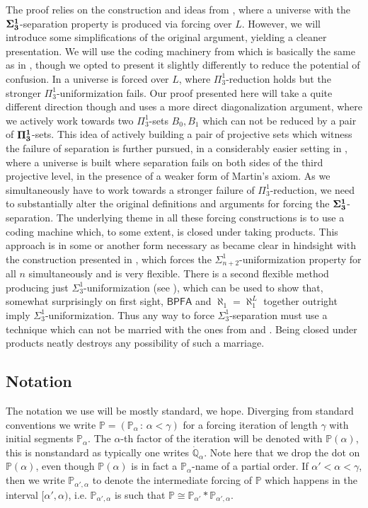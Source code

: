\documentclass[a4paper,11pt]{article}
\newcommand{\forceP}{\mathbb{P}}
\newcommand{\forceQ}{\mathbb{Q}}
\begin{document}
The proof relies on the construction and ideas from \cite{Ho1}, where a universe with the $\bf{\Sigma}^1_3$-separation property is produced via forcing over $L$. However, we will introduce some simplifications of the original argument, yielding a cleaner presentation. We will use the coding machinery from \cite{Ho3} which is basically the same as in \cite{Ho2}, though we opted to present it slightly differently to reduce the potential of confusion. In \cite{Ho3} a universe is forced over $L$, where $\Pi^1_3$-reduction holds but the stronger $\Pi^1_3$-uniformization fails. Our proof presented here will take a quite different direction though and uses a more direct diagonalization argument, where we actively work towards two $\Pi^1_3$-sets $B_0, B_1$ which can not be reduced by a pair of $\bf{\Pi}^1_3$-sets. This idea of actively building a pair of projective sets which witness the failure of separation is further pursued, in a considerably easier setting in \cite{HOFFELNER2026103667}, where a universe is built where separation fails on both sides of the third projective level, in the presence of a weaker form of Martin's axiom.  As we simultaneously have to work towards a stronger failure of $\Pi^1_3$-reduction, we need to substantially alter the original definitions and arguments for forcing the $\bf{\Sigma}^1_3$-separation. The underlying theme in all these forcing constructions is to use a coding machine which, to some extent, is closed under taking products. This approach is in some or another form necessary as became clear in hindsight with the construction presented in \cite{HOFFELNER2025110272}, which forces the $\Sigma^1_{n+2}$-uniformization property for all $n$ simultaneously and is very flexible. There is a second flexible method producing just $\Sigma^1_3$-uniformization (see \cite{HOFFELNER2024103466}), which can be used to show that, somewhat surprisingly on first sight, $\mathsf{BPFA}$ and $\aleph_1=\aleph_1^L$ together outright imply $\Sigma^1_3$-uniformization. Thus any way to force $\Sigma^1_3$-separation must use a technique which can not be married with the ones from \cite{HOFFELNER2025110272} and \cite{HOFFELNER2024103466}. Being closed under products neatly destroys any possibility of such a marriage. 




\subsection{Notation}
The notation we use will be mostly standard, we hope. Diverging from standard conventions we write $\forceP=(\forceP_{\alpha} \, : \, \alpha < \gamma)$ for a forcing iteration of length $\gamma$ with initial segments $\forceP_{\alpha}$. The $\alpha$-th factor of the iteration will be denoted with $\forceP(\alpha)$, this is nonstandard as typically one writes $\dot{\forceQ}_{\alpha}$. Note here that we drop the dot on $\forceP(\alpha)$, even though $\forceP(\alpha)$ is in fact a $\forceP_{\alpha}$-name of a partial order. 
If $\alpha' < \alpha < \gamma$, then we write $\forceP_{\alpha' ,\alpha}$ to denote the intermediate forcing of $\forceP$ which happens in the interval $[\alpha',\alpha)$, i.e. $\forceP_{\alpha', \alpha}$ is such that 
$\forceP \cong \forceP_{\alpha'} \ast \forceP_{\alpha', \alpha}$.
\end{document}
